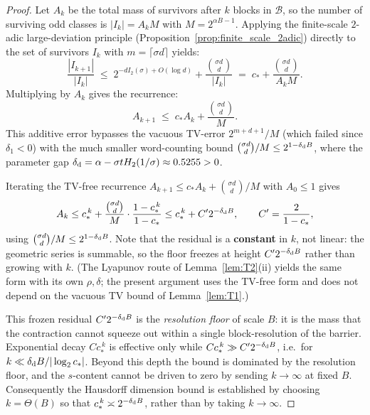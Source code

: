 \documentclass[12pt,a4paper]{article}
\begin{document}
\begin{proof}
Let $A_k$ be the total mass of survivors after $k$ blocks in $\mathcal B$, so the number of surviving odd classes is $|I_k|=A_k M$ with $M=2^{\alpha B-1}$. Applying the finite-scale $2$-adic large-deviation principle (Proposition~\ref{prop:finite_scale_2adic}) directly to the set of survivors $I_k$ with $m=\lceil\sigma d\rceil$ yields:
\[
\frac{|I_{k+1}|}{|I_k|} \;\le\; 2^{-dI_2(\sigma)+O(\log d)} + \frac{\binom{\sigma d}{d}}{|I_k|} \;=\; c_* + \frac{\binom{\sigma d}{d}}{A_k M}.
\]
Multiplying by $A_k$ gives the recurrence:
\[
A_{k+1} \;\le\; c_* A_k + \frac{\binom{\sigma d}{d}}{M}.
\]
This additive error bypasses the vacuous TV-error $2^{m+d+1}/M$ (which failed since $\delta_1 < 0$) with the much smaller word-counting bound $\binom{\sigma d}{d}/M \le 2^{1-\delta_{\rm d}B}$, where the parameter gap $\delta_{\rm d} = \alpha - \sigma t H_2(1/\sigma) \approx 0.5255 > 0$.

Iterating the TV-free recurrence $A_{k+1}\le c_*A_k+\binom{\sigma d}{d}/M$ with $A_0\le1$ gives
\[
A_k\le c_*^{\,k}+\frac{\binom{\sigma d}{d}}{M}\cdot\frac{1-c_*^{\,k}}{1-c_*}
\le c_*^{\,k}+C'2^{-\delta_{\rm d}B},\qquad C'=\frac{2}{1-c_*},
\]
using $\binom{\sigma d}{d}/M\le2^{1-\delta_{\rm d}B}$. Note that the residual is a \textbf{constant} in $k$, not linear: the geometric series is summable, so the floor freezes at height $C'2^{-\delta_{\rm d}B}$ rather than growing with $k$. (The Lyapunov route of Lemma~\ref{lem:T2}(ii) yields the same form with its own $\rho,\delta$; the present argument uses the TV-free form and does not depend on the vacuous TV bound of Lemma~\ref{lem:T1}.)

This frozen residual $C'2^{-\delta_{\rm d}B}$ is the \emph{resolution floor} of scale $B$: it is the mass that the contraction cannot squeeze out within a single block-resolution of the barrier. Exponential decay $Cc_*^{\,k}$ is effective only while $Cc_*^{\,k}\gg C'2^{-\delta_{\rm d}B}$, i.e.\ for $k\ll\delta_{\rm d}B/|\log_2 c_*|$. Beyond this depth the bound is dominated by the resolution floor, and the $s$-content cannot be driven to zero by sending $k\to\infty$ at fixed $B$. Consequently the Hausdorff dimension bound is established by choosing $k=\Theta(B)$ so that $c_*^{\,k}\asymp2^{-\delta_{\rm d}B}$, rather than by taking $k\to\infty$.


\end{proof}
\end{document}

